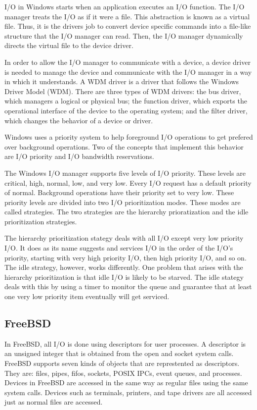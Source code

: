 \documentclass[journal,letterpaper,draftclsnofoot,onecolumn,10pt]{IEEEtran}
\begin{document}
I/O in Windows starts when an application executes an I/O function. The I/O manager treats the I/O as if it were a file. This abstraction is known as a virtual file. Thus, it is the drivers job to convert device specific commands into a file-like structure that the I/O manager can read. Then, the I/O manager dynamically directs the virtual file to the device driver.\cite{2ris12}

In order to allow the I/O manager to communicate with a device, a device driver is needed to manage the device and communicate with the I/O manager in a way in which it understands. A WDM driver is a driver that follows the Windows Driver Model (WDM). There are three types of WDM drivers: the bus driver, which managers a logical or physical bus; the function driver, which exports the operational interface of the device to the operating system; and the filter driver, which changes the behavior of a device or driver.\cite{2ris12}

Windows uses a priority system to help foreground I/O operations to get prefered over background operations. Two of the concepts that implement this behavior are I/O priority and I/O bandwidth reservations.\cite{2ris12}

The Windows I/O manager supports five levels of I/O priority. These levels are critical, high, normal, low, and very low. Every I/O request has a default priority of normal. Background operations have their priority set to very low. These priority levels are divided into two I/O prioritization modes. These modes are called strategies. The two strategies are the hierarchy prioratization and the idle prioritization strategies.

The hierarchy prioritization stategy deals with all I/O except very low priority I/O. It does as its name suggests and services I/O in the order of the I/O's priority, starting with very high priority I/O, then high priority I/O, and so on. The idle strategy, however, works differently. One problem that arises with the hierarchy prioritization is that idle I/O is likely to be starved. The idle stategy deals with this by using a timer to monitor the queue and guarantee that at least one very low priority item eventually will get serviced.\cite{2ris12}

\subsection{FreeBSD}

In FreeBSD, all I/O is done using descriptors for user processes. A descriptor is an unsigned integer that is obtained from the open and socket system calls. FreeBSD supports seven kinds of objects that are represtented as descriptors. They are: files, pipes, fifos, sockets, POSIX IPCs, event queues, and processes. Devices in FreeBSD are accessed in the same way as regular files using the same system calls. Devices such as terminals, printers, and tape drivers are all accessed just as normal files are accessed.\cite{mn15}
\end{document}
